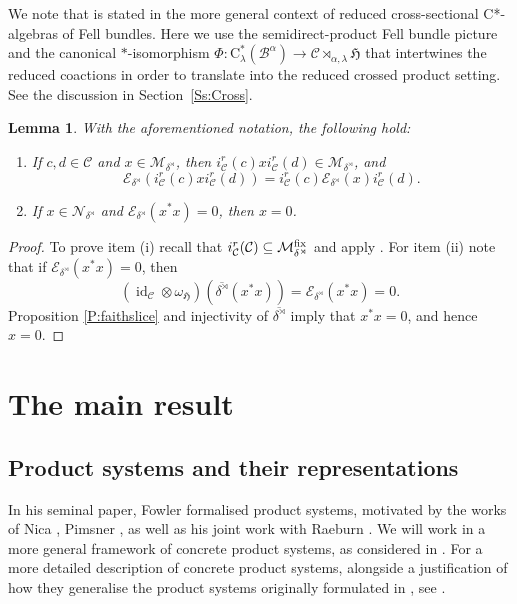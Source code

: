 \documentclass[11pt,final]{amsart}
\numberwithin{equation}{section}
\theoremstyle{plain}
\newtheorem{lemma}[theorem]{Lemma}
\theoremstyle{definition}
\theoremstyle{remark}
\newcommand{\B}{{\mathcal{B}}}
\newcommand{\C}{{\mathcal{C}}}
\newcommand{\E}{{\mathcal{E}}}
\newcommand{\M}{{\mathcal{M}}}
\newcommand{\N}{{\mathcal{N}}}
\def\al{\alpha}
\def\de{\delta}
\def\la{\lambda}
\def\om{\omega}
\newcommand{\fH}{{\mathfrak{H}}}
\newcommand{\ca}{\mathrm{C}^*}
\newcommand{\ol}{\overline}
\newcommand{\id}{{\operatorname{id}}}
\begin{document}
We note that \cite[Corollary 3.12]{Bus10} is stated in the more general context of reduced cross-sectional C*-algebras of Fell bundles. Here we use the semidirect-product Fell bundle picture and the canonical $*$-isomorphism $\Phi \colon \ca_\la(\B^\al) \to \C\rtimes_{\al,\la}\fH$ that intertwines the reduced coactions in order to translate \cite[Corollary 3.12]{Bus10} into the reduced crossed product setting. See the discussion in Section~\ref{Ss:Cross}.

\begin{lemma}\label{L:Bim}
With the aforementioned notation, the following hold:
\begin{enumerate}
\item If $c,d\in \C$ and $x\in\M_{\de^{\rtimes}}$, then $i_\C^r (c)x i_\C^r (d)\in \M_{\de^{\rtimes}}$, and 
\[
\E_{\de^{\rtimes}}(i_\C^r (c)x i_\C^r (d))=i_\C^r(c) \E_{\de^{\rtimes}}(x) i_\C^r(d).
\]
\item If $x\in\N_{\de^{\rtimes}}$ and $\E_{\de^{\rtimes}}(x^*x)=0$, then $x=0$.
\end{enumerate}
\end{lemma}

\begin{proof}
To prove item (i) recall that $i_\C^r(\C) \subseteq \M^{\rm fix}_{\de^{\rtimes}}$ and apply \cite[Proposition 3.15 (ii) and (iii)]{Bus10}.
For item (ii) note that if $\E_{\de^{\rtimes}}(x^*x)=0$, then
\[
(\id_\C\otimes\om_{\fH})(\ol{\de^{\rtimes}}(x^* x))= \E_{\de^{\rtimes}}(x^*x) =0.
\]
Proposition \ref{P:faithslice} and injectivity of $\ol{\de^{\rtimes}}$ imply that $x^*x=0$, and hence $x=0$.
\end{proof}

\section{The main result}

\subsection{Product systems and their representations}

In his seminal paper, Fowler \cite{Fow02} formalised product systems, motivated by the works of Nica \cite{Nic92}, Pimsner \cite{Pim97}, as well as his joint work with Raeburn \cite{FR98}. We will work in a more general framework of concrete product systems, as considered in \cite{KP25}. For a more detailed description of concrete product systems, alongside a justification of how they generalise the product systems originally formulated in \cite{Fow02}, see \cite[Section~2]{KP25}.
\end{document}

